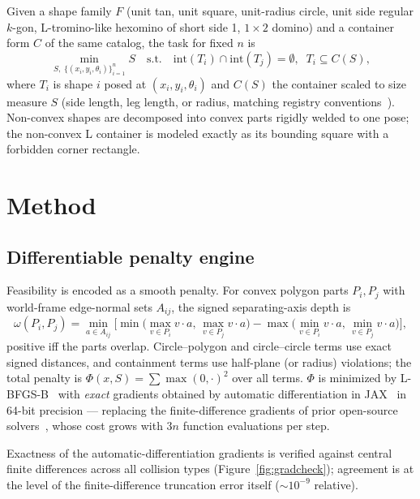 \documentclass[pdflatex,sn-mathphys-num]{sn-jnl}
\theoremstyle{thmstyleone}%
\begin{document}
Given a shape family $F$ (unit tan, unit square, unit-radius circle, unit
side regular $k$-gon, L-tromino-like hexomino of short side 1, $1\times 2$
domino) and a container form $C$ of the same catalog, the task for fixed $n$
is
\begin{equation}
\min_{S,\; \{(x_i, y_i, \theta_i)\}_{i=1}^n} S
\quad\text{s.t.}\quad
\mathrm{int}(T_i) \cap \mathrm{int}(T_j) = \emptyset,\;\;
T_i \subseteq C(S),
\end{equation}
where $T_i$ is shape $i$ posed at $(x_i, y_i, \theta_i)$ and $C(S)$ the
container scaled to size measure $S$ (side length, leg length, or radius,
matching registry conventions~\cite{friedman2009survey}). Non-convex shapes
are decomposed into convex parts rigidly welded to one pose; the non-convex
L container is modeled exactly as its bounding square with a forbidden
corner rectangle.

\section{Method}\label{sec:method}

\subsection{Differentiable penalty engine}\label{sec:engine}

Feasibility is encoded as a smooth penalty. For convex polygon parts $P_i,
P_j$ with world-frame edge-normal sets $A_{ij}$, the signed separating-axis
depth is
\begin{equation}
\omega(P_i, P_j) = \min_{a \in A_{ij}}
\Big[ \min\big(\max_{v \in P_i} v{\cdot}a,\, \max_{v \in P_j} v{\cdot}a\big)
- \max\big(\min_{v \in P_i} v{\cdot}a,\, \min_{v \in P_j} v{\cdot}a\big) \Big],
\end{equation}
positive iff the parts overlap. Circle--polygon and circle--circle terms use
exact signed distances, and containment terms use half-plane (or radius)
violations; the total penalty is $\Phi(x, S) = \sum \max(0, \cdot)^2$ over
all terms. $\Phi$ is minimized by L-BFGS-B~\cite{liu1989lbfgs} with
\emph{exact} gradients obtained by automatic differentiation in
JAX~\cite{jax2018github} in 64-bit precision --- replacing the
finite-difference gradients of prior open-source
solvers~\cite{vallejo2026packer}, whose cost grows with $3n$ function
evaluations per step.

Exactness of the automatic-differentiation gradients is verified against
central finite differences across all collision types
(Figure~\ref{fig:gradcheck}); agreement is at the level of the
finite-difference truncation error itself ($\sim 10^{-9}$ relative).
\end{document}
